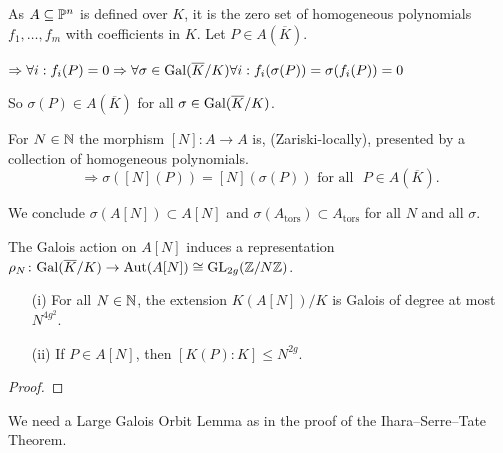 \documentclass{beamer}
\begin{document}
\begin{frame}
  As $A\subseteq{\mathbb{P}}^n$ is defined over $K$, it is the zero set 
  of  homogeneous polynomials $f_1,\ldots,f_m$ with
  coefficients in $K$. Let $P\in A(\overline K)$. 

  $\Rightarrow \forall i: f_i(P) = 0 
  \Rightarrow \forall \sigma\in\mathrm{Gal}(\overline{K}/K) \forall i: f_i(\sigma(P))=\sigma(f_i(P))=0$

  So $\sigma(P) \in A(\overline K)$ for all $\sigma\in \mathrm{Gal}(\overline{K}/K)$. 

  For $N\in{\mathbb{N}}$ the morphism
  $[N]\colon A\rightarrow A$ is, (Zariski-locally), presented
  by a collection of homogeneous polynomials. 
  $$\Rightarrow \sigma([N](P)) = 
  [N](\sigma(P))\text{ for {all} $P\in A(\overline K)$.}$$
  

  We conclude 
  $\sigma(A[N])\subset A[N]$ and
  $\sigma(A_{\mathrm{tors}}) \subset A_{\mathrm{tors}}$ for all $N$
  and all $\sigma$. 

  \begin{definition}
    The Galois action on $A[N]$ induces a representation
    $\rho_N \colon \mathrm{Gal}(\overline{K}/K)\rightarrow\mathrm{Aut}(A[N]) \cong
    \mathrm{GL}_{2g}({\mathbb{Z}}/N{\mathbb{Z}})$.
  \end{definition}
\end{frame}
\begin{frame}
  
  \begin{lemma}
    \begin{enumerate}
    \item[(i)]
      For all $N\in{\mathbb{N}}$, the extension  $K(A[N])/K$ is Galois
      of degree at most $N^{4g^2}$.
    \item[(ii)] If $P\in A[N]$, then $[K(P):K]\le N^{2g}$.
    \end{enumerate}
  \end{lemma}
  \begin{proof}
    \vspace{3cm}
  \end{proof}

  We need a \alert{Large Galois Orbit Lemma} as in the proof of the
  Ihara--Serre--Tate Theorem. 
\end{frame}
\end{document}
